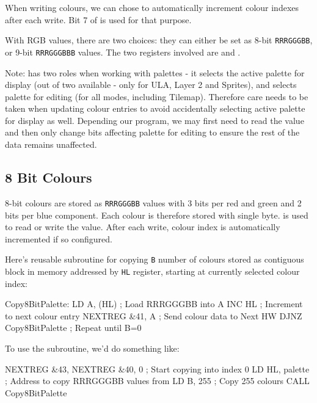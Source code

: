 When writing colours, we can chose to automatically increment colour indexes after each write. Bit 7 of  is used for that purpose.

With RGB values, there are two choices: they can either be set as 8-bit {\tt RRRGGGBB}, or 9-bit {\tt RRRGGGBBB} values. The two registers involved are  and .

Note:  has two roles when working with palettes - it selects the active palette for display (out of two available - only for ULA, Layer 2 and Sprites), and selects palette for editing (for all modes, including Tilemap). Therefore care needs to be taken when updating colour entries to avoid accidentally selecting active palette for display as well. Depending our program, we may first need to read the value and then only change bits affecting palette for editing to ensure the rest of the data remains unaffected.


\subsection{8 Bit Colours}

8-bit colours are stored as {\tt RRRGGGBB} values with 3 bits per red and green and 2 bits per blue component. Each colour is therefore stored with single byte.  is used to read or write the value. After each write, colour index is automatically incremented if so configured.

Here's reusable subroutine for copying {\tt B} number of colours stored as contiguous block in memory addressed by {\tt HL} register, starting at currently selected colour index:

\begin{tcblisting}{}
Copy8BitPalette:
	LD A, (HL)                ; Load RRRGGGBB into A
	INC HL                    ; Increment to next colour entry
	NEXTREG &41, A            ; Send colour data to Next HW
	DJNZ Copy8BitPalette      ; Repeat until B=0
\end{tcblisting}

To use the subroutine, we'd do something like:

\begin{tcblisting}{}
	NEXTREG &43, %
	NEXTREG &40, 0            ; Start copying into index 0
	LD HL, palette            ; Address to copy RRRGGGBB values from
	LD B, 255                 ; Copy 255 colours
	CALL Copy8BitPalette
\end{tcblisting}


